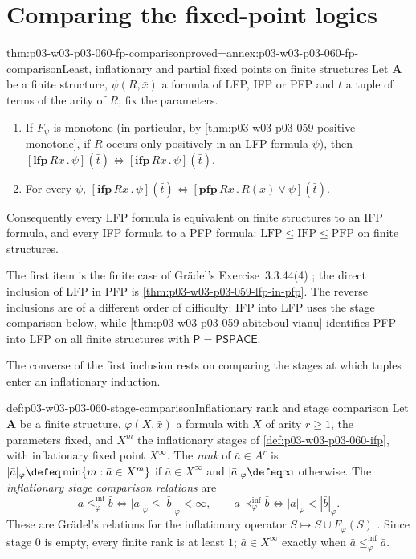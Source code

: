 \section{Comparing the fixed-point logics}
\label{sec:p03-w03-p03-060-comparison}

\begin{hbtheorem}{thm:p03-w03-p03-060-fp-comparison}{proved=annex:p03-w03-p03-060-fp-comparison}{Least, inflationary and partial fixed points on finite structures}
Let \(\mathbf A\) be a finite structure, \(\psi(R,\bar x)\) a formula of
LFP, IFP or PFP and \(\bar t\) a tuple of terms of the arity of \(R\); fix
the parameters.
\begin{enumerate}
\item If \(F_\psi\) is monotone (in particular, by
      \cref{thm:p03-w03-p03-059-positive-monotone}, if \(R\) occurs only
      positively in an LFP formula \(\psi\)), then
      \([\mathbf{lfp}\,R\bar x\,.\,\psi](\bar t)\Leftrightarrow
      [\mathbf{ifp}\,R\bar x\,.\,\psi](\bar t)\).
\item For every \(\psi\),
      \([\mathbf{ifp}\,R\bar x\,.\,\psi](\bar t)\Leftrightarrow
      [\mathbf{pfp}\,R\bar x\,.\,R(\bar x)\vee\psi](\bar t)\).
\end{enumerate}
Consequently every LFP formula is equivalent on finite structures to an
IFP formula, and every IFP formula to a PFP formula:
\(\mathrm{LFP}\le\mathrm{IFP}\le\mathrm{PFP}\) on finite structures.
\end{hbtheorem}

The first item is the finite case of Gr\"adel's Exercise~3.3.44(4)
\cite[p.~174]{Gradel2007FMTDescriptiveChapter}; the direct inclusion of LFP
in PFP is \cref{thm:p03-w03-p03-059-lfp-in-pfp}. The reverse inclusions are
of a different order of difficulty: IFP into LFP uses the stage comparison
below, while \cref{thm:p03-w03-p03-059-abiteboul-vianu} identifies
PFP into LFP on all finite structures with
\(\mathsf P=\mathsf{PSPACE}\).

The converse of the first inclusion rests on comparing the stages at which
tuples enter an inflationary induction.

\begin{hbdefinition}{def:p03-w03-p03-060-stage-comparison}{Inflationary rank and stage comparison}
Let \(\mathbf A\) be a finite structure, \(\varphi(X,\bar x)\) a formula
with \(X\) of arity \(r\ge1\), the parameters fixed, and \(X^m\) the
inflationary stages of \cref{def:p03-w03-p03-060-ifp}, with inflationary
fixed point \(X^\infty\). The \emph{rank} of \(\bar a\in A^r\) is
\(|\bar a|_\varphi\defeq\min\{m:\bar a\in X^m\}\) if
\(\bar a\in X^\infty\) and \(|\bar a|_\varphi\defeq\infty\) otherwise. The
\emph{inflationary stage comparison relations} are
\[
 \bar a\le^{\mathrm{inf}}_\varphi\bar b\iff|\bar a|_\varphi\le|\bar b|_\varphi<\infty,
 \qquad
 \bar a\prec^{\mathrm{inf}}_\varphi\bar b\iff|\bar a|_\varphi<|\bar b|_\varphi .
\]
These are Gr\"adel's relations for the inflationary operator
\(S\mapsto S\cup F_\varphi(S)\) \cite[Def.~3.3.47,
p.~175]{Gradel2007FMTDescriptiveChapter}. Since stage \(0\) is empty, every
finite rank is at least \(1\); \(\bar a\in X^\infty\) exactly when
\(\bar a\le^{\mathrm{inf}}_\varphi\bar a\).
\end{hbdefinition}


